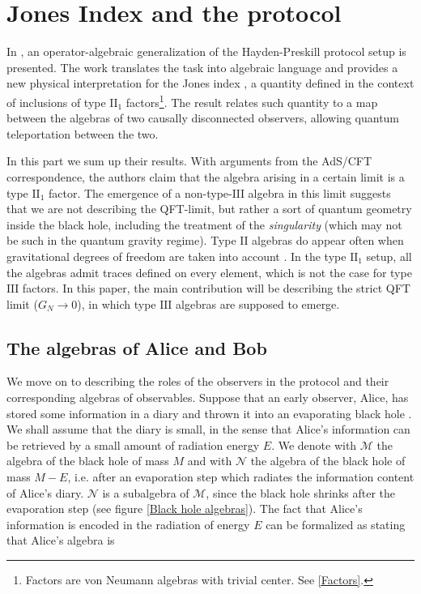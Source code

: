 \documentclass[a4paper,11pt]{article}
\begin{document}
\section{Jones Index and the protocol}

 In \cite{Verlinde}, an operator-algebraic generalization of the Hayden-Preskill \cite{Hayden} protocol setup is presented. The work translates the task into algebraic language and provides a new physical interpretation for the Jones index \cite{Jones}, a quantity defined in the context of inclusions of type $\mathrm{II}_1$ factors\footnote{Factors are von Neumann algebras with trivial center. See \ref{Factors}.}. The result relates such quantity to a map between the algebras of two causally disconnected observers, allowing quantum teleportation between the two. 

In this part we sum up their results. With arguments from the AdS/CFT correspondence, the authors claim that the algebra arising in a certain limit is a type $\mathrm{II}_1$ factor. The emergence of a non-type-$\mathrm{III}$ algebra in this limit suggests that we are not describing the QFT-limit, but rather a sort of quantum geometry inside the black hole, including the treatment of the \textit{singularity} (which may not be such in the quantum gravity regime). Type $\mathrm{II}$ algebras do appear often when gravitational degrees of freedom are taken into account \cite{Witten-Longo}. In the type $\mathrm{II}_1$ setup, all the algebras admit traces defined on every element, which is not the case for type $\mathrm{III}$ factors. In this paper, the main contribution will be describing the strict QFT limit ($G_N \rightarrow 0$), in which type $\mathrm{III}$ algebras are supposed to emerge.

\subsection{The algebras of Alice and Bob}

We move on to describing the roles of the observers in the protocol and their corresponding algebras of observables. Suppose that an early observer, Alice, has stored some information in a diary and thrown it into an evaporating black hole \cite{Hawking}. We shall assume that the diary is small, in the sense that Alice's information can be retrieved by a small amount of radiation energy $E$. We denote with $\mathcal{M}$ the algebra of the black hole of mass $M$ and with $\mathcal{N}$ the algebra of the black hole of mass $M - E$, i.e. after an evaporation step which radiates the information content of Alice's diary. $\mathcal{N}$ is a subalgebra of $\mathcal{M}$, since the black hole shrinks after the evaporation step (see figure \ref{Black hole algebras}). The fact that Alice's information is encoded in the radiation of energy $E$ can be formalized as stating that Alice's algebra is
\end{document}
